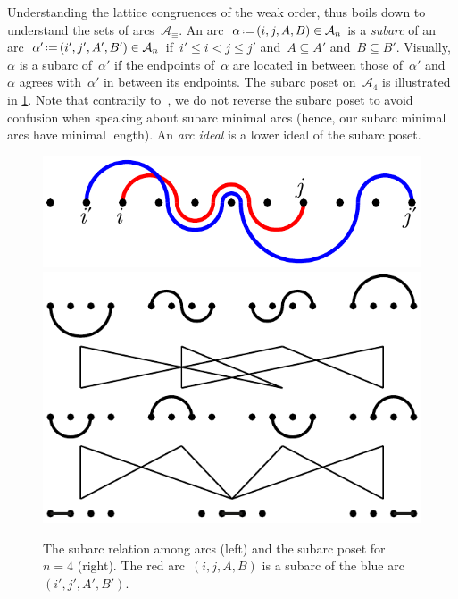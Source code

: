 \documentclass{amsart}
\theoremstyle{definition}
\newcommand{\eqdef}{\mbox{\,\raisebox{0.2ex}{\scriptsize\ensuremath{\mathrm:}}\ensuremath{=}\,}} %
\newcommand{\darkblue}{\color{darkblue}} %
\newcommand{\defn}[1]{\textsl{\darkblue #1}} %
\newcommand{\arc}{\alpha} %
\newcommand{\arcs}{{\mathcal{A}}} %
\begin{document}
Understanding the lattice congruences of the weak order, thus boils down to understand the sets of arcs~$\arcs_\equiv$.
An arc~$\arc \eqdef (i, j, A, B) \in \arcs_n$ is a \defn{subarc} of an arc~$\arc' \eqdef (i', j', A', B') \in \arcs_n$ if~$i' \le i < j \le j'$ and~${A \subseteq A'}$ and~${B \subseteq B'}$.
Visually, $\arc$ is a subarc of~$\arc'$ if the endpoints of~$\arc$ are located in between those of~$\arc'$ and~$\arc$ agrees with~$\arc'$ in between its endpoints.
The subarc poset on~$\arcs_4$ is illustrated in \cref{fig:subarcOrder}.
Note that contrarily to~\cite{Reading-arcDiagrams, PilaudSantos-quotientopes, PadrolPilaudRitter}, we do not reverse the subarc poset to avoid confusion when speaking about subarc minimal arcs (hence, our subarc minimal arcs have minimal length).
An \defn{arc ideal} is a lower ideal of the subarc poset.

\begin{figure}
	\capstart
	\centerline{\includegraphics[scale=.7,valign=c]{forcing} \hspace{1cm} \includegraphics[scale=.6,valign=c]{subarcOrder}}
	\caption{The subarc relation among arcs (left) and the subarc poset for~$n = 4$ (right). The red arc~$(i,j,A,B)$ is a subarc of the blue arc~$(i',j',A',B')$. \mbox{\cite[Fig.~5]{PilaudSantos-quotientopes}}}
	\label{fig:subarcOrder}
\end{figure}
\end{document}
